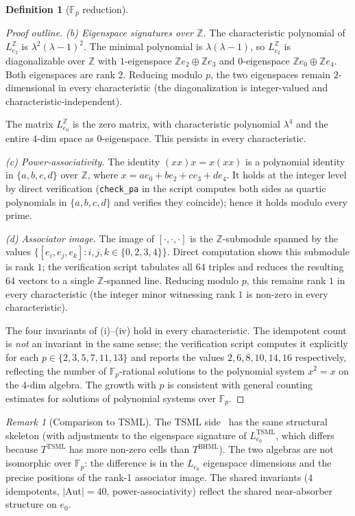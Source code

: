 \documentclass[11pt,reqno]{amsart}
\theoremstyle{plain}
\theoremstyle{definition}
\newtheorem{definition}[theorem]{Definition}
\theoremstyle{remark}
\newtheorem*{remark}{Remark}
\newcommand{\Z}{\mathbb{Z}}
\newcommand{\F}{\mathbb{F}}
\newcommand{\TSML}{\mathrm{TSML}}
\newcommand{\BHML}{\mathrm{BHML}}
\newcommand{\Aut}{\mathrm{Aut}}
\begin{document}
\begin{definition}[$\F_{p}$ reduction]
\begin{proof}[Proof outline]
\textit{(b) Eigenspace signatures over $\Z$.}
The characteristic polynomial of $L_{e_{2}}^{\Z}$ is $\lambda^{2}
(\lambda - 1)^{2}$. The minimal polynomial is $\lambda(\lambda - 1)$,
so $L_{e_{2}}^{\Z}$ is diagonalizable over $\Z$ with $1$-eigenspace
$\Z e_{2} \oplus \Z e_{3}$ and $0$-eigenspace $\Z e_{0} \oplus \Z e_{4}$.
Both eigenspaces are rank $2$. Reducing modulo $p$, the two
eigenspaces remain $2$-dimensional in every characteristic (the
diagonalization is integer-valued and characteristic-independent).

The matrix $L_{e_{0}}^{\Z}$ is the zero matrix, with characteristic
polynomial $\lambda^{4}$ and the entire $4$-dim space as
$0$-eigenspace. This persists in every characteristic.

\textit{(c) Power-associativity.} The identity $(x x) x = x (x x)$
is a polynomial identity in $\{a, b, c, d\}$ over $\Z$, where $x = a
e_{0} + b e_{2} + c e_{3} + d e_{4}$. It holds at the integer level
by direct verification (\texttt{check\_pa} in the script computes both
sides as quartic polynomials in $\{a, b, c, d\}$ and verifies they
coincide); hence it holds modulo every prime.

\textit{(d) Associator image.} The image of $[\cdot, \cdot, \cdot]$
is the $\Z$-submodule spanned by the values $\{[e_{i}, e_{j},
e_{k}] : i, j, k \in \{0, 2, 3, 4\}\}$. Direct computation shows
this submodule is rank $1$; the verification script tabulates all
$64$ triples and reduces the resulting $64$ vectors to a single
$\Z$-spanned line. Reducing modulo $p$, this remains rank $1$ in
every characteristic (the integer minor witnessing rank $1$ is
non-zero in every characteristic).

\smallskip
The four invariants of (i)--(iv) hold in every characteristic. The
idempotent count is \emph{not} an invariant in the same sense; the
verification script computes it explicitly for each
$p \in \{2, 3, 5, 7, 11, 13\}$ and reports the values
$2, 6, 8, 10, 14, 16$ respectively, reflecting the number of
$\F_{p}$-rational solutions to the polynomial system $x^{2} = x$ on
the $4$-dim algebra. The growth with $p$ is consistent with general
counting estimates for solutions of polynomial systems over $\F_{p}$.
\end{proof}

\begin{remark}[Comparison to TSML]
The TSML side~\cite{SandersGishFpTSML} has the same structural
skeleton (with adjustments to the eigenspace signature of
$L_{e_{0}}^{\TSML}$, which differs because $T^{\TSML}$ has more
non-zero cells than $T^{\BHML}$). The two algebras are not
isomorphic over $\F_{p}$: the difference is in the $L_{e_{0}}$
eigenspace dimensions and the precise positions of the rank-1
associator image. The shared invariants ($4$ idempotents, $|\Aut| =
40$, power-associativity) reflect the shared near-absorber structure
on $e_{0}$.
\end{remark}


\end{definition}
\end{document}
